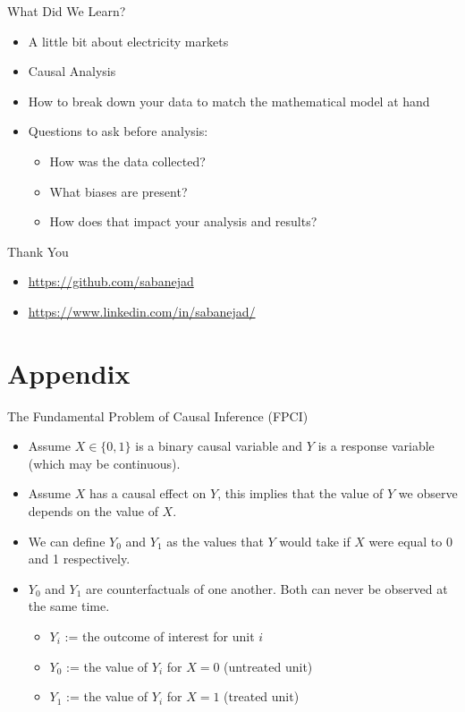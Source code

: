\documentclass{beamer}
\begin{document}
\begin{frame}{What Did We Learn?}
  \begin{itemize}
    \item<+-> A little bit about electricity markets
    \item<+-> Causal Analysis
    \item<+-> How to break down your data to match the mathematical model at hand
    \item<+-> Questions to ask before analysis:
    \begin{itemize}
      \item<+-> How was the data collected? 
      \item<+-> What biases are present?
      \item<+-> How does that impact your analysis and results?
    \end{itemize}
  \end{itemize}
\end{frame}

\begin{frame}{Thank You}
  \begin{itemize}
  \item \url{https://github.com/sabanejad}
  \item \url{https://www.linkedin.com/in/sabanejad/}
  \end{itemize}
\end{frame}

\section{Appendix}

\begin{frame}{The Fundamental Problem of Causal Inference (FPCI)}
  \begin{itemize}
    \item<+-> Assume $X \in\{0,1\}$ is a binary causal variable and $Y$ is a response variable (which may be continuous).
    \item<+-> Assume $X$ has a causal effect on $Y$, this implies that the value of $Y$ we observe depends on the value of $X$.
    \item<+-> We can define $Y_0$ and $Y_1$ as the values that $Y$ would take if $X$ were equal to 0 and 1 respectively.
    \item<+-> $Y_0$ and $Y_1$ are counterfactuals of one another. Both can never be observed at the same time.
    \begin{itemize}
      \item $Y_i$ := the outcome of interest for unit $i$
      \item $Y_0$ := the value of $Y_i$ for $X=0$ (untreated unit)
      \item $Y_1$ := the value of $Y_i$ for $X=1$ (treated unit)
    \end{itemize}
  \end{itemize}
\end{frame}
\end{document}
